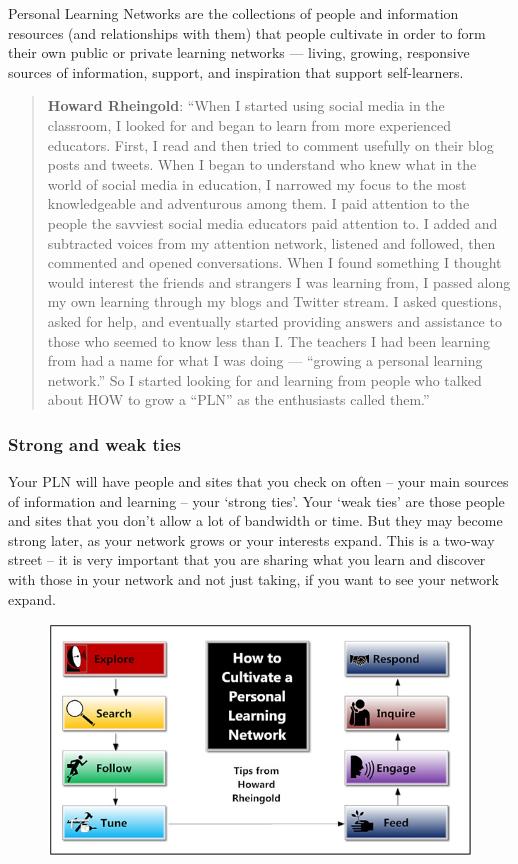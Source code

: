 Personal Learning Networks are the collections of people and information
resources (and relationships with them) that people cultivate in order
to form their own public or private learning networks --- living,
growing, responsive sources of information, support, and inspiration
that support self-learners.

\begin{quote}
\textbf{Howard Rheingold}: ``When I started using social media in the
classroom, I looked for and began to learn from more experienced
educators. First, I read and then tried to comment usefully on their
blog posts and tweets. When I began to understand who knew what in the
world of social media in education, I narrowed my focus to the most
knowledgeable and adventurous among them. I paid attention to the people
the savviest social media educators paid attention to. I added and
subtracted voices from my attention network, listened and followed, then
commented and opened conversations. When I found something I thought
would interest the friends and strangers I was learning from, I passed
along my own learning through my blogs and Twitter stream. I asked
questions, asked for help, and eventually started providing answers and
assistance to those who seemed to know less than I. The teachers I had
been learning from had a name for what I was doing --- ``growing a
personal learning network.'' So I started looking for and learning from
people who talked about HOW to grow a ``PLN'' as the enthusiasts called
them.''
\end{quote}
\subsubsection{Strong and weak ties}

Your PLN will have people and sites that you check on often -- your main
sources of information and learning -- your `strong ties'. Your `weak
ties' are those people and sites that you don't allow a lot of bandwidth
or time. But they may become strong later, as your network grows or your
interests expand. This is a two-way street -- it is very important that
you are sharing what you learn and discover with those in your network
and not just taking, if you want to see your network expand.

\begin{figure}[htbp]
\centering
\includegraphics[width=\textwidth]{../pictures/cultivate.jpg}
\end{figure}


